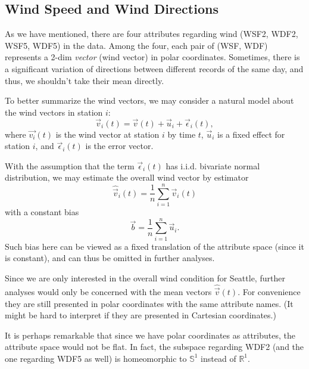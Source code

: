 \subsection{Wind Speed and Wind Directions}

As we have mentioned, there are four attributes regarding wind (WSF2, WDF2, WSF5, WDF5) in the data. Among the four, each pair of (WSF, WDF) represents a 2-dim \emph{vector} (wind vector) in polar coordinates. Sometimes, there is a significant variation of directions between different records of the same day, and thus, we shouldn't take their mean directly.

To better summarize the wind vectors, we may consider a natural model about the wind vectors in station $i$:
$$\vec v_i(t)=\vec{v}(t)+\vec u_i+\vec\epsilon_i(t),$$
where $\vec{v_i}(t)$ is the wind vector at station $i$ by time $t$, $\vec u_i$ is a fixed effect for station $i$, and $\vec \epsilon_i(t)$ is the error vector.

With the assumption that the term $\vec\epsilon_i(t)$ has i.i.d. bivariate normal distribution, we may estimate the overall wind vector by estimator
$$\hat{\vec v}_i(t)=\frac1n\sum_{i=1}^n\vec v_i(t)$$
with a constant bias
$$\vec b=\frac1n\sum_{i=1}^n\vec u_i.$$
Such bias here can be viewed as a fixed translation of the attribute space (since it is constant), and can thus be omitted in further analyses.

Since we are only interested in the overall wind condition for Seattle, further analyses would only be concerned with the mean vectors $\hat{\vec v}(t)$. For convenience they are still presented in polar coordinates with the same attribute names. (It might be hard to interpret if they are presented in Cartesian coordinates.)

It is perhaps remarkable that since we have polar coordinates as attributes, the attribute space would not be flat. In fact, the subspace regarding WDF2 (and the one regarding WDF5 as well) is homeomorphic to $\mathbb S^1$ instead of $\mathbb R^1$.